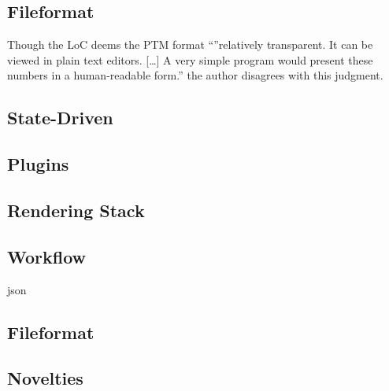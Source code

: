 \subsection{Fileformat}
Though the LoC deems the PTM format ``''relatively transparent. It can be viewed
in plain text editors. [\ldots] A very simple program would present these
numbers in a human-readable
form.''\cite*{library_of_congress_polynomial_2018} the author disagrees with
this judgment.


\subsection{State-Driven}
\subsection{Plugins}
\subsection{Rendering Stack}

\subsection{Workflow}
json

\subsection{Fileformat}

\subsection{Novelties}
